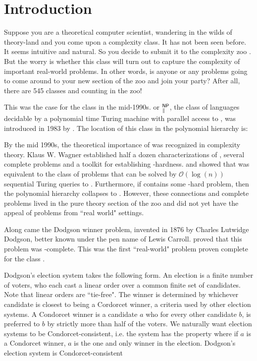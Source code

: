 \section{Introduction}\label{sec:intro}

    Suppose you are a theoretical computer scientist, wandering in the wilds
of theory-land and you come upon a complexity class.
It has not been seen before.
It seems intuitive and natural.
So you decide to submit it to the complexity zoo \citep{zoo}.
But the worry is whether this class will turn out to capture the complexity
of important real-world problems.
In other words, is anyone or any problems going to come around to your new
section of the zoo and join your party?
After all, there are 545 classes and counting
in the zoo!

This was the case for the class \tp in the mid-1990s.
\tp  or $^{\mathsf{NP}}_{\parallel}$, the class of
languages decidable by a polynomial time Turing machine with parallel access to
\np, was introduced in 1983 by \citep{PZ83}.
The location of this class in the polynomial hierarchy is:





By the mid 1990s, the theoretical importance of \tp was recognized in complexity theory.
Klaus W. Wagner established half a dozen characterizations of \tp  \citep{wag90},
several complete problems and a toolkit for establishing \tp-hardness.
\citet{hem87} and \citet{ksw87} showed that \tp was equivalent to the class of
problems that can be solved by $\mathcal{O}(\log(n))$ sequential Turing queries to \np.
Furthermore, if \np contains some \tp-hard problem, then the polynomial hierarchy
collapses to \np.
However, these connections and complete problems
lived in the pure theory section of the zoo and did not yet have the appeal of
problems from ``real world" settings.

Along came the Dodgson winner problem, invented in 1876 by Charles Lutwidge
Dodgson, better known under the pen name of Lewis Carroll.
\citet{exactdodgson} proved that this problem was \tp-complete.
This was the first ``real-world" problem proven complete for the class \tp.

Dodgson's election system takes the following form.
An election is a finite number of voters, who each cast a linear order
over a common finite set of candidates.
Note that linear orders are ``tie-free".
The winner is determined by whichever candidate is closest to being a Cordorcet
winner, a criteria used by other election systems.
A Condorcet winner is a candidate $a$ who for every other candidate $b$, is
preferred to $b$ by strictly more than half of the voters.
We naturally want election systems to be Condorcet-consistent, i.e. the system
has the property where if $a$ is a Condorcet winner, $a$ is the one and only
winner in the election.
Dodgson's election system is Condorcet-consistent \citep{handbookcss}

